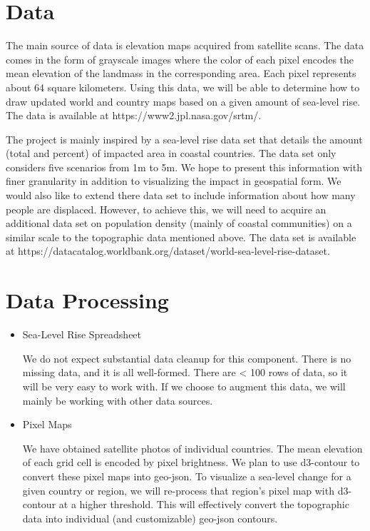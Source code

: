 \documentclass[12pt]{article}
\begin{document}
	\section{Data}
		The main source of data is elevation maps acquired from satellite scans.
		The data comes in the form of grayscale images where the color of each pixel encodes the mean elevation of the landmass in the corresponding area.
		Each pixel represents about 64 square kilometers.
		Using this data, we will be able to determine how to draw updated world and country maps based on a given amount of sea-level rise.
		The data is available at https://www2.jpl.nasa.gov/srtm/.

		The project is mainly inspired by a sea-level rise data set that details the amount (total and percent) of impacted area in coastal countries.
		The data set only considers five scenarios from 1m to 5m.
		We hope to present this information with finer granularity in addition to visualizing the impact in geospatial form.
		We would also like to extend there data set to include information about how many people are displaced.
		However, to achieve this, we will need to acquire an additional data set on population density (mainly of coastal communities) on a similar scale to the topographic data mentioned above.
		The data set is available at https://datacatalog.worldbank.org/dataset/world-sea-level-rise-dataset.

	\section{Data Processing}
		\begin{itemize}
			\item
				Sea-Level Rise Spreadsheet

				We do not expect substantial data cleanup for this component.
				There is no missing data, and it is all well-formed.
				There are < 100 rows of data, so it will be very easy to work with.
				If we choose to augment this data, we will mainly be working with other data sources.

			\item
				Pixel Maps

				We have obtained satellite photos of individual countries.
				The mean elevation of each grid cell is encoded by pixel brightness.
				We plan to use d3-contour to convert these pixel maps into geo-json.
				To visualize a sea-level change for a given country or region, we will re-process that region's pixel map with d3-contour at a higher threshold.
				This will effectively convert the topographic data into individual (and customizable) geo-json contours.

		\end{itemize}
\end{document}

